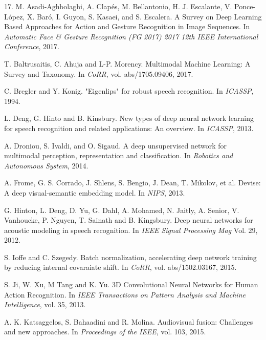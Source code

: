 \begin{thebibliography}{99}

  17. M. Asadi-Aghbolaghi, A. Clapés, M. Bellantonio, H. J. Escalante, 
  V. Ponce-López, X. Baró, I. Guyon, S. Kasaei, and S. Escalera. 
  A Survey on Deep Learning Based Approaches for Action and Gesture 
  Recognition in Image Sequences. 
  In \textit{Automatic Face \& Gesture Recognition (FG 2017) 2017 12th IEEE
  International Conference}, 2017.

  T. Baltrusaitis, C. Ahuja and L-P. Morency. Multimodal Machine Learning:
  A Survey and Taxonomy. In \textit{CoRR}, vol. abs/1705.09406, 2017.

  C. Bregler and Y. Konig. "Eigenlips" for robust speech recognition.
  In \textit{ICASSP}, 1994.

  L. Deng, G. Hinto and B. Kinsbury. New types of deep neural network
  learning for speech recognition and related applications: An overview.
  In \textit{ICASSP}, 2013.

  A. Droniou, S. Ivaldi, and O. Sigaud. A deep unsupervised network
  for multimodal perception, representation and classification. In
  \textit{Robotics and Autonomous System}, 2014.

  A. Frome, G. S. Corrado, J. Shlens, S. Bengio, J. Dean,
  T. Mikolov, et al. Devise: A deep visual-semantic embedding model. 
  In \textit{NIPS}, 2013.

  G. Hinton, L. Deng, D. Yu, G. Dahl, A. Mohamed, N. Jaitly, A. Senior, V.
  Vanhoucke, P. Nguyen, T. Sainath and B. Kingsbury. Deep neural networks
  for acoustic modeling in speech recognition.
  In \textit{IEEE Signal Processing Mag} Vol. 29, 2012.

  S. Ioffe and C. Szegedy. Batch normalization, accelerating deep network
  training by reducing internal covaraiate shift. In \textit{CoRR},
  vol. abs/1502.03167, 2015.

  S. Ji, W. Xu, M Tang and K. Yu. 3D Convolutional Neural Networks
  for Human Action Recognition. In \textit{IEEE Transactions on Pattern
  Analysis and Machine Intelligence}, vol. 35, 2013.

  A. K. Katsaggelos, S. Bahaadini and R. Molina. Audiovisual fusion:
  Challenges and new approaches. In \textit{Proceedings of the IEEE},
  vol. 103, 2015.


\end{thebibliography}

